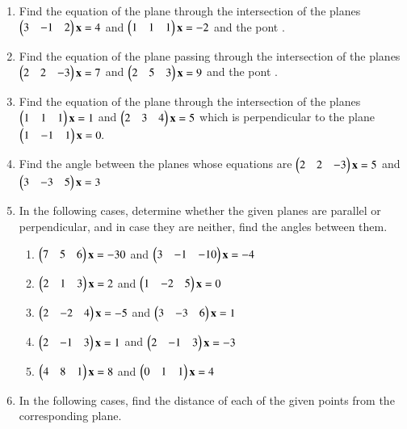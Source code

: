 \begin{enumerate}[label=\arabic*.,ref=\thesubsection.\theenumi]
\item Find the equation of the plane through the intersection of the planes 
$
\begin{pmatrix}3 & -1 & 2\end{pmatrix}\mathbf{x}=4
$
 and 
$
\begin{pmatrix}1 & 1 & 1\end{pmatrix}\mathbf{x}=-2
$
and the pont .
%
\item Find the equation of the plane passing through the intersection of the planes 
$
\begin{pmatrix}2 & 2 & -3\end{pmatrix}\mathbf{x}=7
$
 and 
$
\begin{pmatrix}2 & 5 & 3\end{pmatrix}\mathbf{x}=9
$
and the pont .
%
\item  Find the equation of the plane through the intersection of the planes
$
\begin{pmatrix}1 & 1 & 1\end{pmatrix}\mathbf{x}=1
$
 and 
$
\begin{pmatrix}2 & 3 & 4\end{pmatrix}\mathbf{x}=5
$
which is perpendicular to the plane 
$
\begin{pmatrix}1 & -1 & 1\end{pmatrix}\mathbf{x}=0.
$
%
\item Find the angle between the planes whose equations are
$
\begin{pmatrix}2 & 2 & -3\end{pmatrix}\mathbf{x}=5
$
 and 
$
\begin{pmatrix}3 & -3 & 5\end{pmatrix}\mathbf{x}=3
$
%
\item In the following cases, determine whether the given planes are parallel or perpendicular, and in case they are neither, find the angles between them.
\begin{enumerate}
\item 
$
\begin{pmatrix}7 & 5 & 6\end{pmatrix}\mathbf{x}=-30
$
 and 
$
\begin{pmatrix}3 & -1 & -10\end{pmatrix}\mathbf{x}=-4
$
%
\item 
$
\begin{pmatrix}2 & 1 & 3\end{pmatrix}\mathbf{x}=2
$
 and 
$
\begin{pmatrix}1 & -2 & 5\end{pmatrix}\mathbf{x}=0
$
%
\item 
$
\begin{pmatrix}2 & -2 & 4\end{pmatrix}\mathbf{x}=-5
$
 and 
$
\begin{pmatrix}3 & -3 & 6\end{pmatrix}\mathbf{x}=1
$
\item 
$
\begin{pmatrix}2 & -1 & 3\end{pmatrix}\mathbf{x}=1
$
 and 
$
\begin{pmatrix}2 & -1 & 3\end{pmatrix}\mathbf{x}=-3
$
\item 
$
\begin{pmatrix}4 & 8 & 1\end{pmatrix}\mathbf{x}=8
$
 and 
$
\begin{pmatrix}0 & 1 & 1\end{pmatrix}\mathbf{x}=4
$
\end{enumerate}
\item In the following cases, find the distance of each of the given points from the corresponding plane.
\begin{table}[!h]
\centering

\end{table}
\end{enumerate}
